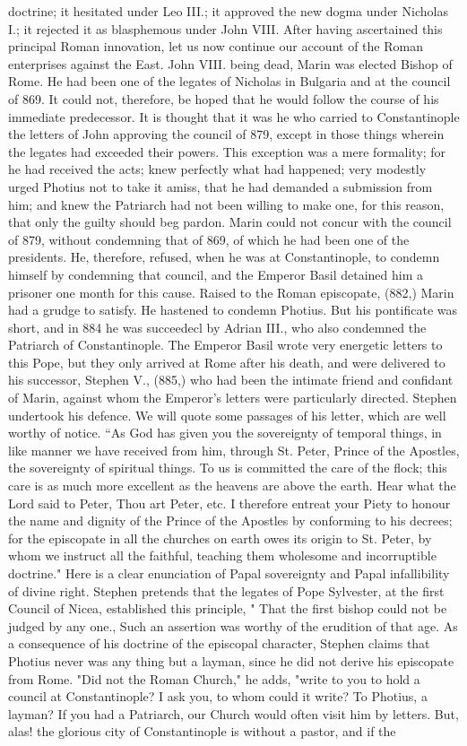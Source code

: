 doctrine; it hesitated under Leo III.; it approved the new dogma under Nicholas I.; it rejected it as blasphemous under John VIII. After having ascertained this principal Roman innovation, let us now continue our account of the Roman enterprises against the East. John VIII. being dead, Marin was elected Bishop of Rome. He had been one of the legates of Nicholas in Bulgaria and at the council of 869. It could not, therefore, be hoped that he would follow the course of his immediate predecessor. It is thought that it was he who carried to Constantinople the letters of John approving the council of 879, except in those things wherein the legates had exceeded their powers. This exception was a mere formality; for he had received the acts; knew perfectly what had happened; very modestly urged Photius not to take it amiss, that he had demanded a submission from him; and knew the Patriarch had not been willing to make one, for this reason, that only the guilty should beg pardon. Marin could not concur with the council of 879, without condemning that of 869, of which he had been one of the presidents. He, therefore, refused, when he was at Constantinople, to condemn himself by condemning that council, and the Emperor Basil detained him a prisoner one month for this cause. Raised to the Roman episcopate, (882,) Marin had a grudge to satisfy. He hastened to condemn Photius. But his pontificate was short, and in 884 he was succeedecl by Adrian III., who also condemned the Patriarch of Constantinople. The Emperor Basil wrote very energetic letters to this Pope, but they only arrived at Rome after his death, and were delivered to his successor, Stephen V., (885,) who had been the intimate friend and confidant of Marin, against whom the Emperor's letters were particularly directed. Stephen undertook his defence. We will quote some passages of his letter, which are well worthy of notice. “As God has given you the sovereignty of temporal things, in like manner we have received from him, through St. Peter, Prince of the Apostles, the sovereignty of spiritual things. To us is committed the care of the flock; this care is as much more excellent as the heavens are above the earth. Hear what the Lord said to Peter, Thou art Peter, etc. I therefore entreat your Piety to honour the name and dignity of the Prince of the Apostles by conforming to his decrees; for the episcopate in all the churches on earth owes its origin to St. Peter, by whom we instruct all the faithful, teaching them wholesome and incorruptible doctrine." Here is a clear enunciation of Papal sovereignty and Papal infallibility of divine right. Stephen pretends that the legates of Pope Sylvester, at the first Council of Nicea, established this principle, " That the first bishop could not be judged by any one., Such an assertion was worthy of the erudition of that age. As a consequence of his doctrine of the episcopal character, Stephen claims that Photius never was any thing but a layman, since he did not derive his episcopate from Rome. "Did not the Roman Church," he adds, "write to you to hold a council at Constantinople? I ask you, to whom could it write? To Photius, a layman? If you had a Patriarch, our Church would often visit him by letters. But, alas! the glorious city of Constantinople is without a pastor, and if the 